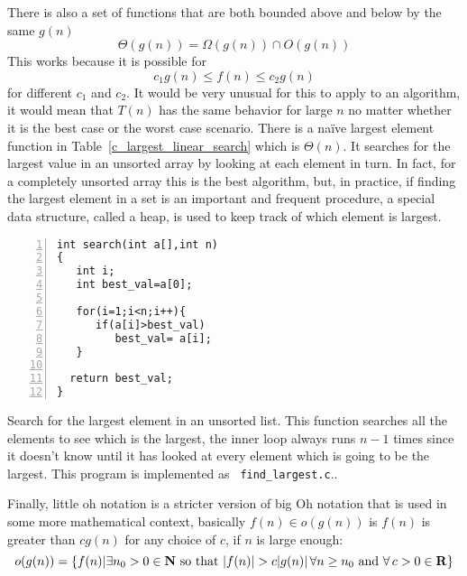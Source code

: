 \documentclass[11pt,a4paper]{scrartcl}
\begin{document}
There is also a set of functions that are both bounded above and below
by the same $g(n)$
\begin{equation}
\Theta(g(n))=\Omega(g(n))\cap O(g(n))
\end{equation}
This works because it is possible for
\begin{equation}
c_1 g(n)\le f(n)\le c_2g(n)
\end{equation}
for different $c_1$ and $c_2$. It would be very unusual for this to
apply to an algorithm, it would mean that $T(n)$ has the same behavior
for large $n$ no matter whether it is the best case or the worst case
scenario. There is a na\"ive largest element function in
Table~\ref{c_largest_linear_search} which is $\Theta(n)$. It searches
for the largest value in an unsorted array by looking at each element
in turn. In fact, for a completely unsorted array this is the best
algorithm, but, in practice, if finding the largest element in a set
is an important and frequent procedure, a special data structure,
called a heap, is used to keep track of which element is largest.

\begin{table}
\begin{lstlisting}[numbers=left]
int search(int a[],int n)
{
   int i;
   int best_val=a[0];

   for(i=1;i<n;i++){
      if(a[i]>best_val)
         best_val= a[i];
   }

  return best_val;
}
\end{lstlisting}
\caption{Search for the largest element in an unsorted list. This
  function searches all the elements to see which is the largest, the
  inner loop always runs $n-1$ times since it doesn't know until it
  has looked at every element which is going to be the largest. This
  program is implemented as {\tt
    find\_largest.c}.\label{c_largest_linear_search}.}
\end{table}

Finally, little oh notation is a stricter version of big Oh notation
that is used in some more mathematical context, basically $f(n)\in
o(g(n))$ is $f(n)$ is greater than $cg(n)$ for any choice of $c$, if $n$
is large enough:
\begin{equation}
o(g(n))=\{f(n)| \exists n_0>0\in {\bf N}\mbox{ so that }|f(n)|>
c|g(n)|\,\forall n\ge n_0 \mbox{ and }\forall\,c>0\in {\bf R}\}
\end{equation}
\end{document}
